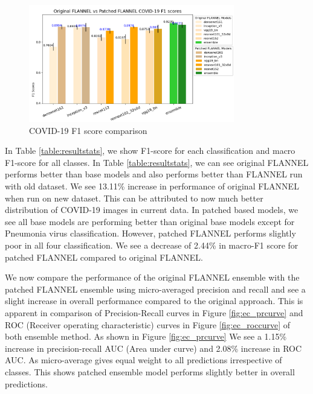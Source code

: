 \documentclass{sigkddExp}
\begin{document}
\begin{figure}[h]
    \centering
    \includegraphics[width=0.8\textwidth]{../doc/images/original_vs_patched_flannel_f1.png}
    \caption{COVID-19 F1 score comparison}
    \label{fig:f1score}
\end{figure}


In Table \ref{table:resultstats}, we show F1-score for each classification
and macro F1-score for all classes. In Table \ref{table:resultstats}, we can see
original FLANNEL performs better than base models and also performs better than
FLANNEL run with old dataset\cite{10.1093/jamia/ocaa280}. We see 13.11\% increase in performance of original
FLANNEL when run on new dataset. This can be attributed to now much better distribution
of COVID-19 images in current data. In patched based models, we see all base models
are performing better than original base models except for Pneumonia virus classification.
However, patched FLANNEL performs slightly poor in all four classification.
We see a decrease of 2.44\% in macro-F1 score for patched FLANNEL compared to
original FLANNEL.


We now compare the performance of the original FLANNEL ensemble with the patched
FLANNEL ensemble using micro-averaged precision and recall and see a slight
increase in overall performance compared to the original approach. This is
apparent in comparison of Precision-Recall curves in Figure \ref{fig:ec_prcurve}
and ROC (Receiver operating characteristic) curves in Figure
\ref{fig:ec_roccurve} of both ensemble method. As shown in Figure
\ref{fig:ec_prcurve} We see a 1.15\% increase in precision-recall AUC (Area
under curve) and 2.08\% increase in ROC AUC. As micro-average gives equal weight
to all predictions irrespective of classes. This shows patched ensemble model
performs slightly better in overall predictions.
\end{document}
